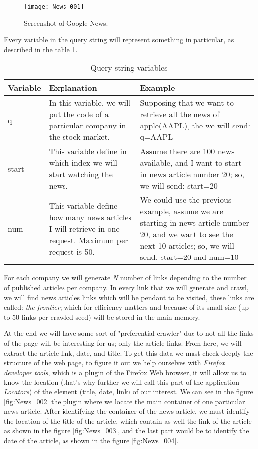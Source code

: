 	\begin{figure}\centering
		\texttt{[image: News\_001]}
		\caption{Screenshot of Google News.}\label{fig:News_001}
	\end{figure}

Every variable in the query string will represent something in particular, as described in  the table \ref{tab:query-string}.

\begin{table}\centering
	\caption{Query string variables}\label{tab:query-string}
   	\begin{tabular}{ | l | p{4cm\textwidth} | p{6cm\textwidth} |}
   	\hline
   	\textbf{Variable}  & \textbf{Explanation} & \textbf{Example}  \\ \hline
    	q & 
	In this variable, we will put the code of a particular company in the stock market.  & 
	Supposing that we want to retrieve all the news of apple(AAPL), the we will send: q=AAPL\\ \hline
	start & 
	This variable define in which index we will start watching the news.  & 
	Assume there are 100 news available, and I want to start in news article number 20; so, we will send: start=20 \\ \hline
	num & 
	This variable define how many news articles I will retrieve in one request. Maximum per request is 50. &
	We could use the previous example, assume we are starting in news article number 20, and we want to see the next 10 articles; so, we will send: start=20 and num=10 \\ \hline
    \end{tabular}
\end{table}

For each company we will generate \textit{N} number of links depending to the number of published articles per company. In every link that we will generate and crawl, we will find news articles links which will be pendant to be visited, these links are called:  \textit{the frontier}; which for efficiency matters and because of its small size (up to 50 links per crawled seed) will be stored in the main memory.

At the end we will have some sort of "preferential crawler"  \cite%
{L2011} due to not all the links of the page will be interesting for us; only the article links. From here, we will extract the article link, date, and title. To get this data we must check deeply the structure of the web page, to figure it out we help ourselves with \emph{Firefox developer tools}, which is a plugin of the Firefox Web browser, it will allow us to know the location (that's why further we will call this part of the application \emph{Locators}) of the element (title, date, link) of our interest. We can see in the figure \ref{fig:News_002} the plugin where we locate the main container of one particular news article. After identifying the container of the news article, we must identify the location of the title of the article, which contain as well the link of the article as shown in the figure \ref{fig:News_003}, and the last part would be to identify the date of the article, as shown in the figure \ref{fig:News_004}. 

